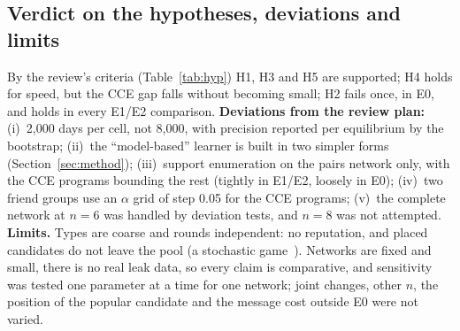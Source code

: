 \documentclass[conference]{IEEEtran}
\theoremstyle{plain}
\theoremstyle{definition}\newtheorem{definition}{Definition}
\begin{document}
\subsection{Verdict on the hypotheses, deviations and limits}
By the review's criteria (Table~\ref{tab:hyp}) H1, H3 and H5 are supported; H4 holds for speed, but the CCE gap falls without becoming small; H2 fails once, in E0, and holds in every E1/E2 comparison.
\textbf{Deviations from the review plan:} (i)~2{,}000 days per cell, not 8{,}000, with precision reported per equilibrium by the bootstrap; (ii)~the ``model-based'' learner is built in two simpler forms (Section~\ref{sec:method});
(iii)~support enumeration on the pairs network only, with the CCE programs bounding the rest (tightly in E1/E2, loosely in E0); (iv)~two friend groups use an $\alpha$ grid of step 0.05 for the CCE programs; (v)~the complete network at $n=6$ was handled by deviation tests, and $n=8$ was not attempted.
\textbf{Limits.} Types are coarse and rounds independent: no reputation, and placed candidates do not leave the pool (a stochastic game~\cite{shapley}). Networks are fixed and small, there is no real leak data, so every claim is comparative,
and sensitivity was tested one parameter at a time for one network; joint changes, other $n$, the position of the popular candidate and the message cost outside E0 were not varied.

\end{document}
